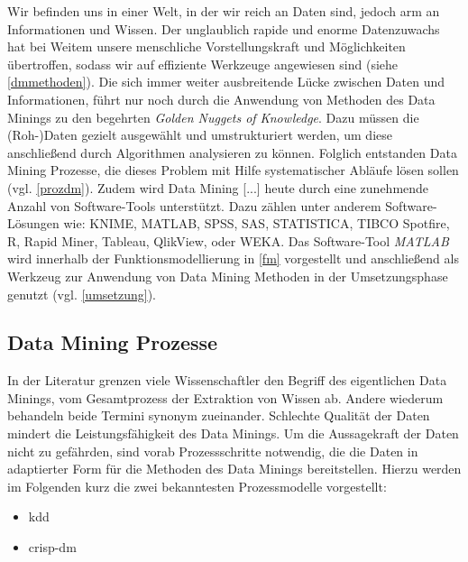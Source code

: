 \glqq Wir befinden uns in einer Welt, in der wir reich an Daten sind, jedoch arm an Informationen und Wissen.\grqq{} Der unglaublich rapide und enorme Datenzuwachs hat bei Weitem unsere menschliche Vorstellungskraft und Möglichkeiten übertroffen, sodass wir auf effiziente Werkzeuge angewiesen sind (siehe \vref{dmmethoden}). Die sich immer weiter ausbreitende Lücke zwischen Daten und Informationen, führt nur noch durch die Anwendung von Methoden des Data Minings zu den begehrten \glqq \textit{Golden Nuggets of Knowledge}\grqq. Dazu müssen die (Roh-)Daten gezielt ausgewählt und umstrukturiert werden, um diese anschließend durch Algorithmen analysieren zu können. Folglich entstanden Data Mining Prozesse, die dieses Problem mit Hilfe systematischer Abläufe lösen sollen (vgl. \vref{prozdm}). Zudem wird \glqq Data Mining [...] heute durch eine zunehmende Anzahl von Software-Tools unterstützt. Dazu zählen unter anderem Software-Lösungen wie: KNIME, MATLAB, SPSS, SAS, STATISTICA, TIBCO Spotfire, R, Rapid Miner, Tableau, QlikView, oder WEKA.\grqq{} Das Software-Tool \textit{MATLAB} wird innerhalb der Funktionsmodellierung in \vref{fm} vorgestellt und anschließend als Werkzeug zur Anwendung von Data Mining Methoden in der Umsetzungsphase genutzt (vgl. \vref{umsetzung}).


\subsection{Data Mining Prozesse}
\label{prozdm}

In der Literatur grenzen viele Wissenschaftler den Begriff des eigentlichen Data Minings, vom Gesamtprozess der Extraktion von Wissen ab. Andere wiederum behandeln beide Termini synonym zueinander. Schlechte Qualität der Daten mindert die Leistungsfähigkeit des Data Minings. Um die Aussagekraft der Daten nicht zu gefährden, sind vorab Prozessschritte notwendig, die die Daten in adaptierter Form für die Methoden des Data Minings bereitstellen. Hierzu werden im Folgenden kurz die zwei bekanntesten Prozessmodelle vorgestellt:

\begin{itemize}
\item \gls{kdd}
\item \gls{crisp-dm}
\end{itemize}

